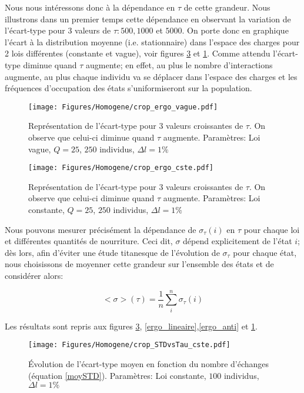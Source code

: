 Nous nous intéressons donc à la dépendance en $\tau$ de cette grandeur. Nous illustrons dans un premier temps cette dépendance en observant la variation de l'écart-type pour 3 valeurs de $\tau: 500, 1000$ et $5000$. On porte donc en graphique l'écart à la distribution moyenne (i.e. stationnaire) dans l'espace des charges pour 2 lois différentes (constante et vague), voir figures \ref{ergo_cste} et \ref{ergo_vague}. Comme attendu l'écart-type diminue quand $\tau$ augmente; en effet, au plus le nombre d'interactions augmente, au plus chaque individu va se déplacer dans l'espace des charges et les fréquences d'occupation des états s'uniformiseront sur la population.\\



\begin{figure}[h]
\centering
\texttt{[image: Figures/Homogene/crop\_ergo\_vague.pdf]}
\caption{Représentation de l'écart-type pour 3 valeurs croissantes de $\tau$. On observe que celui-ci diminue quand $\tau$ augmente. Paramètres: Loi vague, $Q=25$, $250$ individus, $\Delta l = 1\%$}
\label{ergo_vague}
\end{figure}

\begin{figure}[h]
\centering
\texttt{[image: Figures/Homogene/crop\_ergo\_cste.pdf]}
\caption{Représentation de l'écart-type pour 3 valeurs croissantes de $\tau$. On observe que celui-ci diminue quand $\tau$ augmente. Paramètres: Loi constante, $Q=25$, $250$ individus, $\Delta l = 1\%$}
\label{ergo_cste}
\end{figure}


Nous pouvons mesurer précisément la dépendance de $\sigma_{\tau}(i)$ en $\tau$ pour chaque loi et différentes quantités de nourriture. Ceci dit, $\sigma$ dépend explicitement de l'état $i$; dès lors, afin d'éviter une étude titanesque de l'évolution de $\sigma_{\tau}$ pour chaque état, nous choisissons de moyenner cette grandeur sur l'ensemble des états et de considérer alors:

\begin{equation}
<\sigma>(\tau)=\frac{1}{n}\sum_i^n \sigma_{\tau}(i)
\label{moySTD}
\end{equation}

Les résultats sont repris aux figures \ref{ergo_cste}, \ref{ergo_lineaire},\ref{ergo_anti} et \ref{ergo_vague}.

\begin{figure}[h]
\centering
\texttt{[image: Figures/Homogene/crop\_STDvsTau\_cste.pdf]}
\caption{Évolution de l'écart-type moyen en fonction du nombre d'échanges (équation \ref{moySTD}). Paramètres: Loi constante, $100$ individus, $\Delta l = 1\%$}
\label{ergo_cste}
\end{figure}

